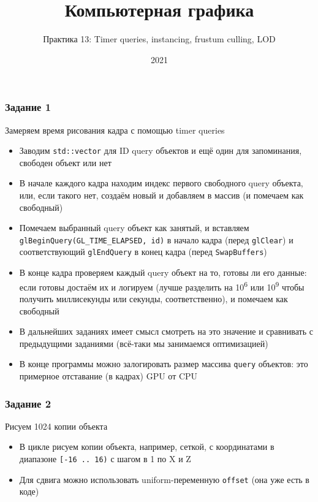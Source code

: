 \documentclass{beamer}
\title{Компьютерная графика}
\subtitle{Практика 13: Timer queries, instancing, frustum culling, LOD}
\date{2021}
\begin{document}
\frame{\titlepage}

\begin{frame}[fragile]
\fontsize{10pt}{10pt}
\frametitle{Задание 1}
Замеряем время рисования кадра с помощью timer queries
\begin{itemize}
\item Заводим \verb|std::vector| для ID query объектов и ещё один для запоминания, свободен объект или нет
\pause
\item В начале каждого кадра находим индекс первого свободного query объекта, или, если такого нет, создаём новый и добавляем в массив (и помечаем как свободный)
\pause
\item Помечаем выбранный query объект как занятый, и вставляем \verb|glBeginQuery(GL_TIME_ELAPSED, id)| в начало кадра (перед \verb|glClear|) и соответствующий \verb|glEndQuery| в конец кадра (перед \verb|SwapBuffers|)
\pause
\item В конце кадра проверяем каждый query объект на то, готовы ли его данные: если готовы \textendash{} достаём их и логируем (лучше разделить на 10\textsuperscript{6} или 10\textsuperscript{9} чтобы получить миллисекунды или секунды, соответственно), и помечаем как свободный
\pause
\item В дальнейших заданиях имеет смысл смотреть на это значение и сравнивать с предыдущими заданиями (всё-таки мы занимаемся оптимизацией)
\pause
\item В конце программы можно залогировать размер массива \verb|query| объектов: это примерное отставание (в кадрах) GPU от CPU
\end{itemize}
\end{frame}

\begin{frame}[fragile]
\frametitle{Задание 2}
Рисуем 1024 копии объекта
\begin{itemize}
\item В цикле рисуем копии объекта, например, сеткой, с координатами в диапазоне \verb|[-16 .. 16)| с шагом в 1 по X и Z
\pause
\item Для сдвига можно использовать uniform-переменную \verb|offset| (она уже есть в коде)
\end{itemize}
\end{frame}
\end{document}
